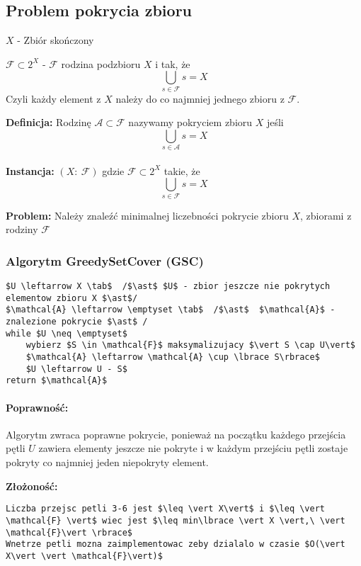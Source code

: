 \subsection{Problem pokrycia zbioru}
$X$ - Zbiór skończony

$\mathcal{F} \subset 2^{X}$ - $\mathcal{F}$ rodzina podzbioru $X$ i tak, że $$\bigcup_{s\in \mathcal{F}}s = X$$ 
Czyli każdy element z $X$ należy do co najmniej jednego zbioru z $\mathcal{F}$.

\textbf{Definicja: }Rodzinę $\mathcal{A}\subset \mathcal{F}$ nazywamy pokryciem zbioru $X$ jeśli $$\bigcup_{s\in \mathcal{A}}s = X$$
\\
\textbf{Instancja: }$(X:\ \mathcal{F})$ gdzie $\mathcal{F} \subset 2^{X}$ takie, że $$\bigcup_{s\in \mathcal{F}}s = X$$

\textbf{Problem: }Należy znaleźć minimalnej liczebności pokrycie zbioru $X$, zbiorami z rodziny $\mathcal{F}$

\subsubsection{Algorytm GreedySetCover (GSC)}
\begin{lstlisting}[caption={GreedySetCover(G)}]
$U \leftarrow X \tab$  /$\ast$ $U$ - zbior jeszcze nie pokrytych elementow zbioru X $\ast$/
$\mathcal{A} \leftarrow \emptyset \tab$  /$\ast$  $\mathcal{A}$ - znalezione pokrycie $\ast$ /
while $U \neq \emptyset$
	wybierz $S \in \mathcal{F}$ maksymalizujacy $\vert S \cap U\vert$
	$\mathcal{A} \leftarrow \mathcal{A} \cup \lbrace S\rbrace$
	$U \leftarrow U - S$
return $\mathcal{A}$
\end{lstlisting}

\paragraph{Poprawność: }
Algorytm zwraca poprawne pokrycie, ponieważ na początku każdego przejścia pętli $U$ zawiera elementy jeszcze nie pokryte i w każdym przejściu pętli zostaje pokryty co najmniej jeden niepokryty element.

\textbf{Złożoność: }
\begin{lstlisting}
Liczba przejsc petli 3-6 jest $\leq \vert X\vert$ i $\leq \vert \mathcal{F} \vert$ wiec jest $\leq min\lbrace \vert X \vert,\ \vert \mathcal{F}\vert \rbrace$
Wnetrze petli mozna zaimplementowac zeby dzialalo w czasie $O(\vert X\vert \vert \mathcal{F}\vert)$
\end{lstlisting}

